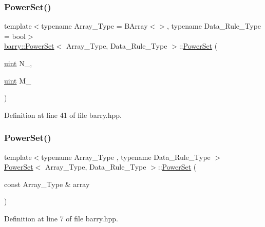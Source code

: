 \subsubsection{\texorpdfstring{Power\+Set()}{PowerSet()}\hspace{0.1cm}{\footnotesize\ttfamily [2/3]}}
{\footnotesize\ttfamily template$<$typename Array\+\_\+\+Type  = B\+Array$<$$>$, typename Data\+\_\+\+Rule\+\_\+\+Type  = bool$>$ \\
\hyperlink{classbarry_1_1_power_set}{barry\+::\+Power\+Set}$<$ Array\+\_\+\+Type, Data\+\_\+\+Rule\+\_\+\+Type $>$\+::\hyperlink{classbarry_1_1_power_set}{Power\+Set} (\begin{DoxyParamCaption}\item[{\hyperlink{namespacebarry_a11dfc53ddb4672278319aa04f1e09a6c}{uint}}]{N\+\_\+,  }\item[{\hyperlink{namespacebarry_a11dfc53ddb4672278319aa04f1e09a6c}{uint}}]{M\+\_\+ }\end{DoxyParamCaption})\hspace{0.3cm}{\ttfamily [inline]}}



Definition at line 41 of file barry.\+hpp.

\mbox{\label{classbarry_1_1_power_set_acc20a68ff11aa1891d9a0676ed50808f}} 
\subsubsection{\texorpdfstring{Power\+Set()}{PowerSet()}\hspace{0.1cm}{\footnotesize\ttfamily [3/3]}}
{\footnotesize\ttfamily template$<$typename Array\+\_\+\+Type , typename Data\+\_\+\+Rule\+\_\+\+Type $>$ \\
\hyperlink{classbarry_1_1_power_set}{Power\+Set}$<$ Array\+\_\+\+Type, Data\+\_\+\+Rule\+\_\+\+Type $>$\+::\hyperlink{classbarry_1_1_power_set}{Power\+Set} (\begin{DoxyParamCaption}\item[{const Array\+\_\+\+Type \&}]{array }\end{DoxyParamCaption})\hspace{0.3cm}{\ttfamily [inline]}}



Definition at line 7 of file barry.\+hpp.

